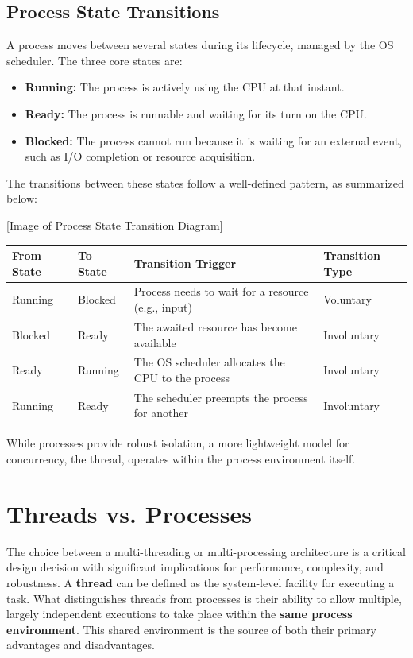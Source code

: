 \documentclass{article} %
\begin{document}
\subsection{Process State Transitions}
A process moves between several states during its lifecycle, managed by the OS scheduler. The three core states are:
\begin{itemize}
    \item \textbf{Running:} The process is actively using the CPU at that instant.
    \item \textbf{Ready:} The process is runnable and waiting for its turn on the CPU.
    \item \textbf{Blocked:} The process cannot run because it is waiting for an external event, such as I/O completion or resource acquisition.
\end{itemize}
The transitions between these states follow a well-defined pattern, as summarized below:


[Image of Process State Transition Diagram]

\begin{center}
\begin{tabular}{|l|l|l|l|}
\hline
\textbf{From State} & \textbf{To State} & \textbf{Transition Trigger} & \textbf{Transition Type} \\
\hline
Running & Blocked & Process needs to wait for a resource (e.g., input) & Voluntary \\
\hline
Blocked & Ready & The awaited resource has become available & Involuntary \\
\hline
Ready & Running & The OS scheduler allocates the CPU to the process & Involuntary \\
\hline
Running & Ready & The scheduler preempts the process for another & Involuntary \\
\hline
\end{tabular}
\end{center}
While processes provide robust isolation, a more lightweight model for concurrency, the thread, operates within the process environment itself.

\section{Threads vs. Processes}
The choice between a multi-threading or multi-processing architecture is a critical design decision with significant implications for performance, complexity, and robustness. A \textbf{thread} can be defined as the system-level facility for executing a task. What distinguishes threads from processes is their ability to allow multiple, largely independent executions to take place within the \textbf{same process environment}.
This shared environment is the source of both their primary advantages and disadvantages.
\end{document}
